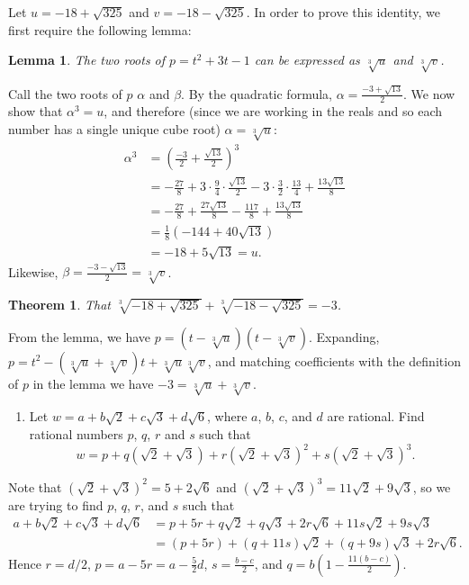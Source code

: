 \documentclass[a4paper,10pt]{article}
\newtheorem*{thm}{Theorem}
\newtheorem*{lemma}{Lemma}
\newcommand{\answer}{\bfseries\color{Emerald}\refstepcounter{enumi}\item[\theenumi.]}
\begin{document}
Let $ u = -18 + \sqrt{325} $ and $ v = -18 - \sqrt{325} $.
In order to prove this identity, we first require the following lemma:
\begin{lemma}
  The two roots of $ p = t^2 + 3t - 1 $ can be expressed as $ \sqrt[3]{u} $
  and $ \sqrt[3]{v} $.
\end{lemma}

Call the two roots of $ p $ $ \alpha $ and $ \beta $. By the quadratic formula,
$ \alpha = \frac{-3 + \sqrt{13}}{2} $. We now show that $ \alpha^3  = u $,
and therefore (since we are working in the reals and so each number has a single
unique cube root) $ \alpha = \sqrt[3]{u} $:
\begin{align*}
  \alpha^3 &= \left( \frac{-3}{2} + \frac{\sqrt{13}}{2} \right)^3\\
           &= -\frac{27}{8} + 3 \cdot \frac{9}{4} \cdot \frac{\sqrt{13}}{2} - 3 \cdot \frac{3}{2} \cdot \frac{13}{4} + \frac{13\sqrt{13}}{8}\\
           &= -\frac{27}{8} + \frac{27\sqrt{13}}{8} - \frac{117}{8} + \frac{13\sqrt{13}}{8}\\
           &= \frac{1}{8}(-144 + 40\sqrt{13})\\
           &= -18 + 5\sqrt{13} = u.
\end{align*}
Likewise, $ \beta = \frac{-3 - \sqrt{13}}{2} = \sqrt[3]{v} $.

\begin{thm}
  That $ \sqrt[3]{-18 + \sqrt{325}} + \sqrt[3]{-18 - \sqrt{325}} = -3 $.
\end{thm}

From the lemma, we have $ p = \left(t - \sqrt[3]{u} \right)\left(t - \sqrt[3]{v} \right) $.
Expanding, $ p = t^2 - \left(\sqrt[3]{u} + \sqrt[3]{v} \right)t + \sqrt[3]{u}\sqrt[3]{v} $,
and matching coefficients with the definition of $ p $ in the lemma we have
$ -3 = \sqrt[3]{u} + \sqrt[3]{v} $.

\filbreak\begin{enumerate}[resume]
  \answer Let $ w = a + b\sqrt{2} + c\sqrt{3} + d\sqrt{6} $, where $ a $, $ b $, $ c $, and $ d $ are rational.
        Find rational numbers $ p $, $ q $, $ r $ and $ s $ such that
        \begin{displaymath}
          w = p + q(\sqrt{2}  + \sqrt{3}) + r(\sqrt{2} + \sqrt{3})^2 + s(\sqrt{2} + \sqrt{3})^3.
        \end{displaymath}
\end{enumerate}

Note that $ (\sqrt{2} + \sqrt{3})^2 = 5 + 2\sqrt{6} $ and $ (\sqrt{2} + \sqrt{3})^3 = 11\sqrt{2} + 9\sqrt{3} $, so we
are trying to find $ p $, $ q $, $ r $, and $ s $ such that
\begin{align*}
  a + b\sqrt{2} + c\sqrt{3} + d\sqrt{6} &= p+ 5r + q\sqrt{2} + q\sqrt{3} + 2r\sqrt{6} + 11s\sqrt{2} + 9s\sqrt{3}\\
                                        &= (p + 5r) + (q + 11s)\sqrt{2} + (q + 9s)\sqrt{3} + 2r \sqrt{6}.
\end{align*}
Hence $ r = d/2 $, $ p = a - 5r = a - \frac{5}{2}d $, $ s = \frac{b - c}{2} $, and $ q = b\left(1 - \frac{11(b-c)}{2}\right) $.
\end{document}
